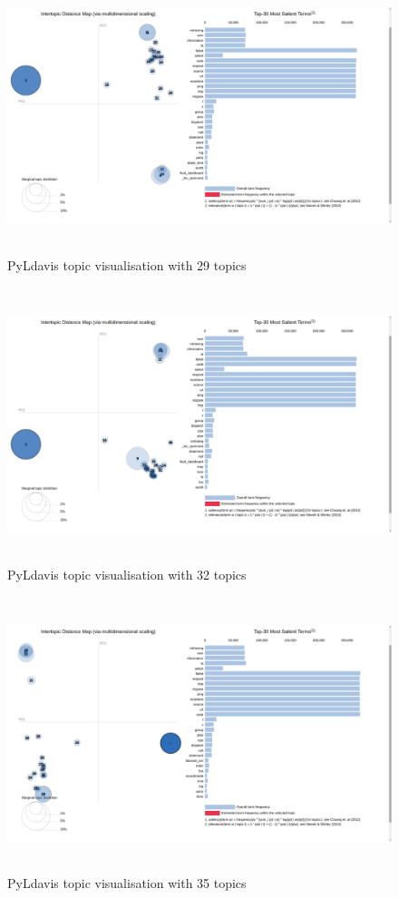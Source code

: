  \begin{figure}[!h]
    \centering
    \includegraphics[width=15cm, height=8cm,trim=0 0 100px 0, clip=true]{figures/pyldavis/pyldavis_29.png}
    \caption{PyLdavis topic visualisation with 29 topics}
    \label{fig:pyldavis_29}
\end{figure}

 \begin{figure}[!h]
    \centering
    \includegraphics[width=15cm, height=8cm,trim=0 0 100px 0, clip=true]{figures/pyldavis/pyldavis_32.png}
    \caption{PyLdavis topic visualisation with 32 topics}
    \label{fig:pyldavis_32}
\end{figure}

 \begin{figure}[!h]
    \centering
    \includegraphics[width=15cm, height=8cm,trim=0 0 100px 0, clip=true]{figures/pyldavis/pyldavis_35.png}
    \caption{PyLdavis topic visualisation with 35 topics}
    \label{fig:pyldavis_35}
\end{figure}


